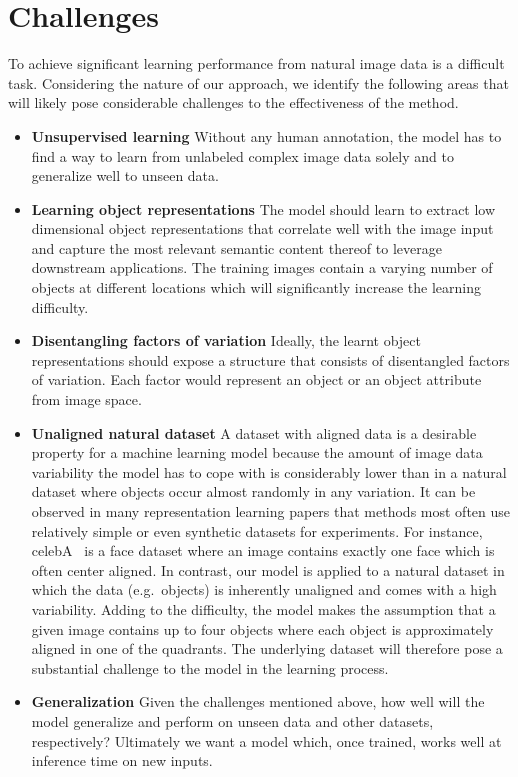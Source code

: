 \documentclass[a4paper,12pt]{report}
\begin{document}
\section{Challenges}
To achieve significant learning performance from natural image data is a difficult task. Considering the nature of our approach, we identify the following areas that will likely pose considerable challenges to the effectiveness of the method.
\begin{itemize}
  \item \textbf{Unsupervised learning} Without any human annotation, the model has to find a way to learn from unlabeled complex image data solely and to generalize well to unseen data.
  \item \textbf{Learning object representations} The model should learn to extract low dimensional object representations that correlate well with the image input and capture the most relevant semantic content thereof to leverage downstream applications. The training images contain a varying number of objects at different locations which will significantly increase the learning difficulty.
  \item \textbf{Disentangling factors of variation} Ideally, the learnt object representations should expose a structure that consists of disentangled factors of variation. Each factor would represent an object or an object attribute from image space.
  \item \textbf{Unaligned natural dataset} A dataset with aligned data is a desirable property for a machine learning model because the amount of image data variability the model has to cope with is considerably lower than in a natural dataset where objects occur almost randomly in any variation. It can be observed in many representation learning papers that methods most often use relatively simple or even synthetic datasets for experiments. For instance, celebA~\cite{celebA} is a face dataset where an image contains exactly one face which is often center aligned. In contrast, our model is applied to a natural dataset in which the data (e.g.\ objects) is inherently unaligned and comes with a high variability. Adding to the difficulty, the model makes the assumption that a given image contains up to four objects where each object is approximately aligned in one of the quadrants. The underlying dataset will therefore pose a substantial challenge to the model in the learning process.
  \item \textbf{Generalization} Given the challenges mentioned above, how well will the model generalize and perform on unseen data and other datasets, respectively? Ultimately we want a model which, once trained, works well at inference time on new inputs. 
\end{itemize}
\end{document}
